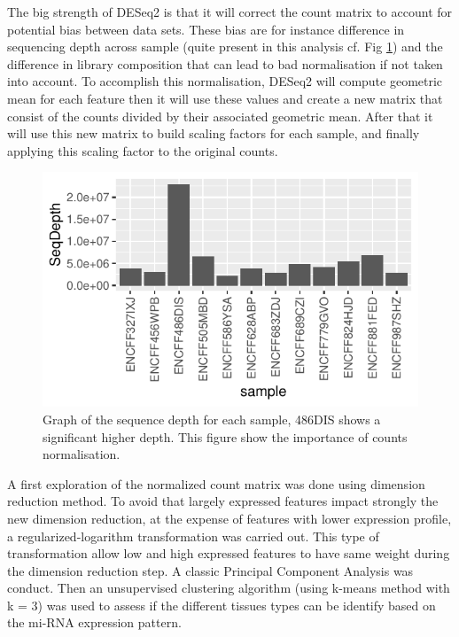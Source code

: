 \documentclass[a4paper, 11pt]{article}
\begin{document}
\begin{multicols}{2}
The big strength of DESeq2 is that it will correct the count matrix to account for potential bias between data sets. These bias are for instance difference in sequencing depth across sample (quite present in this analysis cf. Fig \ref{fig:depth}) and the difference in library composition that can lead to bad normalisation if not taken into account. To accomplish this normalisation, DESeq2 will compute geometric mean for each feature then it will use these values and create a new matrix that consist of the counts divided by their associated geometric mean. After that it will use this new matrix to build scaling factors for each sample, and finally applying this scaling factor to the original counts.
\begin{figure}[H]
	\centering
	\includegraphics[width=1\columnwidth]{Figures/differential_analysis/depth.pdf}
	\caption{\footnotesize{Graph of the sequence depth for each sample, 486DIS shows a significant higher depth. This figure show the importance of counts normalisation.}}
	\label{fig:depth}
\end{figure}

A first exploration of the normalized count matrix was done using dimension reduction method. To avoid that largely expressed features impact strongly the new dimension reduction, at the expense of features with lower expression profile, a regularized-logarithm transformation was carried out. This type of transformation allow low and high expressed features to have same weight during the dimension reduction step. A classic Principal Component Analysis was conduct. Then an unsupervised clustering algorithm (using k-means method with k = 3) was used to assess if the different tissues types can be identify based on the mi-RNA expression pattern.


\end{multicols}
\end{document}
